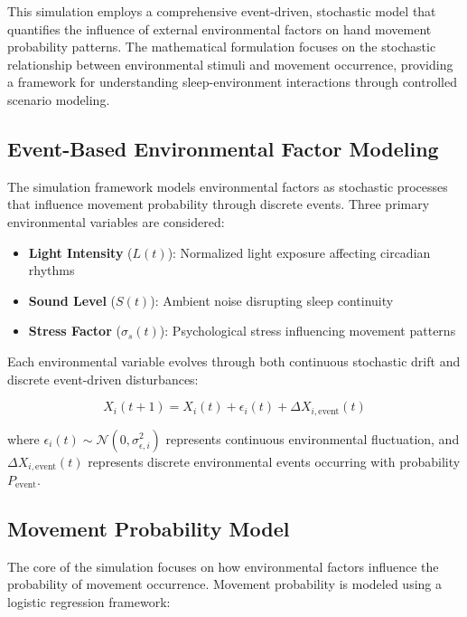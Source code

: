 \documentclass[conference]{IEEEtran}
\begin{document}
This simulation employs a comprehensive event-driven, stochastic model that quantifies the influence of external environmental factors on hand movement probability patterns. The mathematical formulation focuses on the stochastic relationship between environmental stimuli and movement occurrence, providing a framework for understanding sleep-environment interactions through controlled scenario modeling.

\subsection{Event-Based Environmental Factor Modeling}

The simulation framework models environmental factors as stochastic processes that influence movement probability through discrete events. Three primary environmental variables are considered:

\begin{itemize}
	\item \textbf{Light Intensity} ($L(t)$): Normalized light exposure affecting circadian rhythms
	\item \textbf{Sound Level} ($S(t)$): Ambient noise disrupting sleep continuity  
	\item \textbf{Stress Factor} ($\sigma_s(t)$): Psychological stress influencing movement patterns
\end{itemize}

Each environmental variable evolves through both continuous stochastic drift and discrete event-driven disturbances:

\begin{equation}
	X_i(t+1) = X_i(t) + \epsilon_i(t) + \Delta X_{i,\text{event}}(t)
\end{equation}

where $\epsilon_i(t) \sim \mathcal{N}(0, \sigma_{\epsilon,i}^2)$ represents continuous environmental fluctuation, and $\Delta X_{i,\text{event}}(t)$ represents discrete environmental events occurring with probability $P_{\text{event}}$.

\subsection{Movement Probability Model}

The core of the simulation focuses on how environmental factors influence the probability of movement occurrence. Movement probability is modeled using a logistic regression framework:
\end{document}
